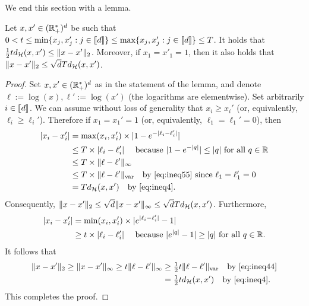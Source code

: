 We end this section with a lemma.
\begin{lemma}
  \label{lem:inq:norm}
  Let     $x,      x'     \in      (\mathbb{R}_{+}^{*})^d$     be      such     that
  $0  < t  \leq \min\{x_{j},  x_{j}' :  j \in  \llbracket d  \rrbracket\} \leq
  \max\{x_{j}, x_{j}'  : j \in  \llbracket d  \rrbracket\} \leq T$.   It holds
  that  $\tfrac{1}{2}t  d_{\mathcal{H}}(x,  x') \leq  \|x-x'\|_{2}$.   Moreover,  if
  $x_1     =     x'_1     =     1$,    then     it     also     holds     that
  $\|x-x'\|_{2} \leq \sqrt{d}T d_{\mathcal{H}}(x, x')$.
\end{lemma}
\begin{proof}
  Set  $x, x'  \in (\mathbb{R}_{+}^{*})^d$  as in  the statement  of the  lemma, and
  denote   $\ell:=   \log(x),  \ell'   :=   \log(x')$   (the  logarithms   are
  elementwise). Set arbitrarily $i \in \llbracket  d \rrbracket$. We can assume without loss
  of    generality   that    $x_{i}    \geq    x_{i}'$   (or,    equivalently,
  $\ell_{i}  \geq   \ell_{i}'$).   Therefore   if  $x_{1}  =   x_{1}'=1$  (or,
  equivalently, $\ell_{1} = \ell_{1}' = 0$), then
  \begin{align*}
    |x_i - x'_i |&= \max(x_i, x'_i) \times |1 - e^{-|\ell_i- \ell'_i|}|\\
                 &\leq T \times |\ell_i- \ell'_i| \quad \text{ because }
                   |1-e^{-|q|}| \leq |q| \text{ for all } q \in \mathbb{R}\\
                 &\leq T \times \|\ell- \ell'\|_{\infty} \\
                 &\leq   T   \times  \|\ell-
                   \ell'\|_{\operatorname{var}} \quad \text{by \eqref{eq:ineq55} since }\ell_{1} =
                   \ell_{1}' = 0\\
                 &= T d_{\mathcal{H}}(x, x') \quad \text{by \eqref{eq:ineq4}}. 
  \end{align*}
  Consequently,
  $\|x -x'\|_{2} \leq \sqrt{d} \|x -x'\|_{\infty} \leq \sqrt{d} T d_{\mathcal{H}}(x,
  x')$.  Furthermore,
  \begin{align*}
    |x_i- x'_i |&= \min(x_i, x'_i) \times |e^{|\ell_i- \ell'_i|} -1|\\
                & \geq t \times |\ell_i- \ell'_i| \quad \text{ because }
                  |e^{|q|} - 1| \geq |q| \text{ for all } q \in \mathbb{R}.
  \end{align*}
  It follows that
  \begin{align*}
    \|x -x'\|_{2} \geq\|x -x'\|_{\infty} \geq t \|\ell- \ell'\|_{\infty}
    & \geq \tfrac{1}{2}t \|\ell- \ell'\|_{\operatorname{var}} \quad \text{by \eqref{eq:ineq44}}\\
    &=  \tfrac{1}{2}td_{\mathcal{H}}(x, x') \quad \text{by \eqref{eq:ineq4}}.
  \end{align*}
  This completes the proof.
\end{proof}

